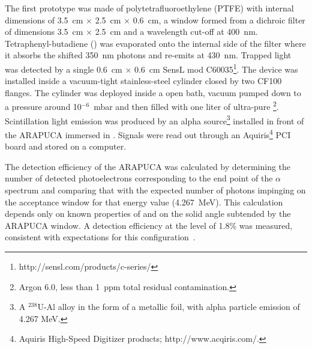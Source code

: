 The first prototype was made of polytetrafluoroethylene (PTFE) with internal dimensions of \SI{3.5}{cm} $\times$ \SI{2.5}{cm} $\times$ \SI{0.6}{cm}, a window formed from a dichroic filter of  dimensions \SI{3.5}{cm} $\times$ \SI{2.5}{cm} and a wavelength cut-off at \SI{400}{nm}. 
Tetraphenyl-butadiene () was evaporated onto the internal side of the filter where it absorbs the shifted \SI{350}{nm} photons and re-emits at \SI{430}{nm}. Trapped light was detected by a single \SI{0.6}{cm} $\times$ \SI{0.6}{cm} SensL  mod C60035\footnote{http://sensl.com/products/c-series/}.
The device was installed inside a vacuum-tight stainless-steel cylinder closed by two CF100 flanges. The cylinder was deployed inside a \lar open bath, vacuum pumped down to a pressure around  10$^{-6}$~\si{mbar} and then filled with one liter of ultra-pure \lar\footnote{Argon 6.0, less than \SI{1}{ppm} total residual contamination.}. 
Scintillation light emission was produced by an alpha source\footnote{A $^{238}$U-Al alloy in the form of a metallic foil, with alpha particle emission of 4.267 MeV.} installed in front of the ARAPUCA immersed in \lar. Signals were read out through an Aquiris\footnote{Aquiris High-Speed Digitizer products; http://www.acqiris.com/.} PCI board and stored on a computer.


The detection efficiency of the ARAPUCA was calculated by determining the number of detected photoelectrons corresponding to the end point of the $\alpha$ spectrum and comparing that with the expected number of photons impinging on the acceptance window for that energy value (\SI{4.267}{MeV}).  This calculation depends only on known properties of \lar and on the solid angle subtended by the ARAPUCA window. A detection efficiency at the level of 1.8\%  was measured, consistent with  expectations for this configuration~\cite{Marinho:2018doi}.


